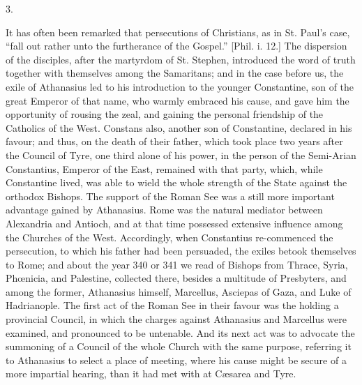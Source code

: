 3.

It has often been remarked that persecutions of Christians, as in
St. Paul's case, ``fall out rather unto the furtherance of the
Gospel.'' [Phil. i. 12.] The dispersion of the disciples, after
the martyrdom of St. Stephen, introduced the word of truth together
with themselves among the Samaritans; and in the case before us, the
exile of Athanasius led to his introduction to the younger
Constantine, son of the great Emperor of that name, who warmly
embraced his cause, and gave him the opportunity of rousing the zeal,
and gaining the personal friendship of the Catholics of the West.
Constans also, another son of Constantine, declared in his favour; and
thus, on the death of their father, which took place two years after
the Council of Tyre, one third alone of his power, in the person of
the Semi-Arian Constantius, Emperor of the East, remained with that
party, which, while Constantine lived, was able to wield the whole
strength of the State against the orthodox Bishops. The support
of the Roman See was a still more important advantage gained by
Athanasius. Rome was the natural mediator between Alexandria and
Antioch, and at that time possessed extensive influence among the
Churches of the West. Accordingly, when Constantius re-commenced the
persecution, to which his father had been persuaded, the exiles betook
themselves to Rome; and about the year 340 or 341 we read of Bishops
from Thrace, Syria, Phœnicia, and Palestine, collected there, besides
a multitude of Presbyters, and among the former, Athanasius himself,
Marcellus, Asciepas of Gaza, and Luke of Hadrianople. The first act of
the Roman See in their favour was the holding a provincial Council, in
which the charges against Athanasius and Marcellus were examined, and
pronounced to be untenable. And its next act was to advocate the
summoning of a Council of the whole Church with the same purpose,
referring it to Athanasius to select a place of meeting, where his
cause might be secure of a more impartial hearing, than it had met
with at Cæsarea and Tyre.

